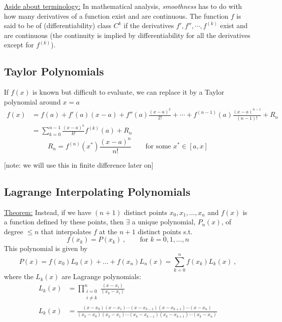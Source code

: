 \documentclass[12pt, answers]{exam}
\begin{document}
\begin{addmargin}[3em]{1em}
\underline{Aside about terminology:} In mathematical analysis, \textit{smoothness} has to do with how many derivatives of a function exist and are continuous. The function $f$ is said to be of (differentiability) class $C^k$ if the derivatives $f', f'', \cdots, f^{(k)}$ exist and are continuous (the continuity is implied by differentiability for all the derivatives except for $f^{(k)}$). 
\end{addmargin}%


\subsection*{Taylor Polynomials}
If $f(x)$ is known but difficult to evaluate, we can replace it by a Taylor polynomial around $x = a$
\begin{align}
f(x) &= f(a) + f'(a)(x-a) + f''(a)\frac{(x-a)^2}{2!} + \cdots + f^{(n-1)}(a)\frac{(x-a)^{n-1}}{(n-1)!} + R_n \nonumber \\
%
  &= \sum_{k=0}^{n-1}\frac{(x-a)^k}{k!}f^{(k)}(a) + R_n \nonumber
%
\end{align}
\ifprintanswers
\[R_n = f^{(n)}(x^*)\frac{(x-a)^{n}}{n!} \qquad \text{for some } x^* \in [a, x]\]
\else
\vspace*{3em}
\fi

[note: we will use this in finite difference later on]


\subsection*{Lagrange Interpolating Polynomials}
%
\underline{Theorem:} 
Instead, if we have $(n+1)$ distinct points $x_0, x_1,\dots, x_n$ and $f(x)$ is a function defined by these points, then $\exists$ a unique polynomial, $P_n(x)$, of degree $\leq n$ that interpolates $f$ at the $n + 1$ distinct points s.t.\
\[f(x_k) = P(x_k)\:, \qquad \text{for }k= 0, 1, \dots, n\]
%
This polynomial is given by
%
\ifprintanswers
\[P(x) = f(x_0)L_0(x) + \dots + f(x_n)L_n(x) = \sum_{k=0}^{n}f(x_k)L_k(x)\:,\]
\else
\vspace*{3em}
\fi
%
where the $L_k(x)$ are Lagrange polynomials:
%
\begin{align}
L_k(x) &= \prod_{\substack{i=0\\ i \neq k}}^n \frac{(x-x_i)}{(x_k-x_i)}\nonumber\\
%
L_k(x) &= \frac{(x-x_0)(x-x_1)\cdots(x-x_{k-1})(x-x_{k+1})\cdots(x-x_n)}{(x_k-x_0)(x_k-x_1)\cdots(x_k-x_{k-1})(x_k-x_{k+1})\cdots(x_k-x_n)}\nonumber
\end{align}
\end{document}

